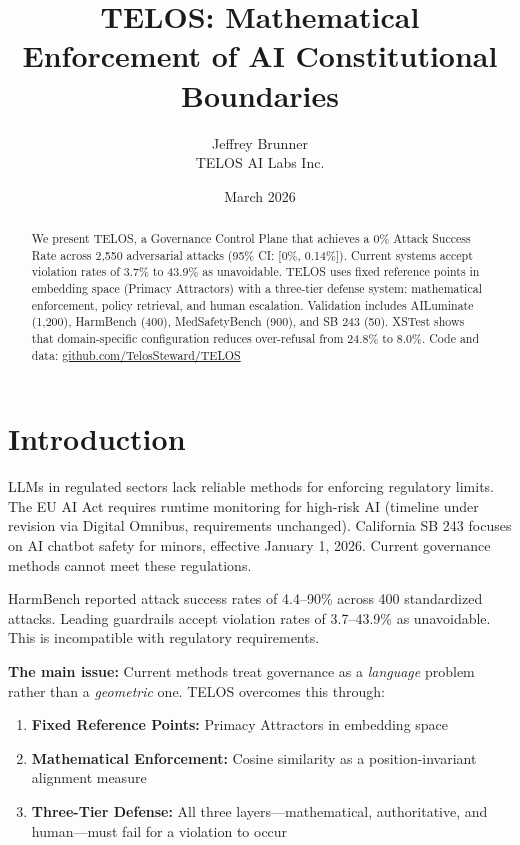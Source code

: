 \documentclass[11pt,twocolumn]{article}
\title{TELOS: Mathematical Enforcement of AI Constitutional Boundaries}
\author{Jeffrey Brunner\\TELOS AI Labs Inc.}
\date{March 2026}
\begin{document}
\maketitle

\begin{abstract}
We present TELOS, a Governance Control Plane that achieves a 0\% Attack Success Rate across 2,550 adversarial attacks (95\% CI: [0\%, 0.14\%]). Current systems accept violation rates of 3.7\% to 43.9\% as unavoidable. TELOS uses fixed reference points in embedding space (Primacy Attractors) with a three-tier defense system: mathematical enforcement, policy retrieval, and human escalation. Validation includes AILuminate (1,200), HarmBench (400), MedSafetyBench (900), and SB 243 (50). XSTest shows that domain-specific configuration reduces over-refusal from 24.8\% to 8.0\%. Code and data: \url{github.com/TelosSteward/TELOS}
\end{abstract}

\section{Introduction}

LLMs in regulated sectors lack reliable methods for enforcing regulatory limits. The EU AI Act requires runtime monitoring for high-risk AI (timeline under revision via Digital Omnibus, requirements unchanged). California SB 243 focuses on AI chatbot safety for minors, effective January 1, 2026. Current governance methods cannot meet these regulations.

HarmBench reported attack success rates of 4.4--90\% across 400 standardized attacks. Leading guardrails accept violation rates of 3.7--43.9\% as unavoidable. This is incompatible with regulatory requirements.

\textbf{The main issue:} Current methods treat governance as a \emph{language} problem rather than a \emph{geometric} one. TELOS overcomes this through:
\begin{enumerate}
    \item \textbf{Fixed Reference Points:} Primacy Attractors in embedding space
    \item \textbf{Mathematical Enforcement:} Cosine similarity as a position-invariant alignment measure
    \item \textbf{Three-Tier Defense:} All three layers---mathematical, authoritative, and human---must fail for a violation to occur
\end{enumerate}
\end{document}
